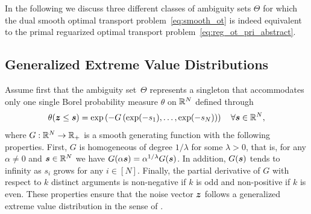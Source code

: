 \documentclass[11pt, a4paper, oneside, reqno]{article}
\begin{document}
	In the following we discuss three different classes of ambiguity sets $\Theta$ for which the dual smooth optimal transport problem~\eqref{eq:smooth_ot} is indeed equivalent to the primal reguarized optimal transport problem~\eqref{eq:reg_ot_pri_abstract}.
	
	\subsection{Generalized Extreme Value Distributions}
	\label{sec:gevm}
	Assume first that the ambiguity set~$\Theta$ represents a singleton that accommodates only one single
	Borel probability measure $\theta$ on $\mathbb{R}^N$ defined through
	\begin{equation}
	\label{eq:dist_gevd}
	\theta(\boldsymbol z \leq \boldsymbol s) = \exp \left(-G \left( \exp(-s_1),\ldots, \exp(-s_N) \right) \right)\quad \forall \boldsymbol s\in\mathbb{R}^N,
	\end{equation}
	where $G:\mathbb{R}^N \to \mathbb{R}_+$ is a smooth generating function with the following properties. First, $G$ is homogeneous of degree $1/\lambda$ for some $\lambda>0$, that is, for any $\alpha \neq 0$ and $\boldsymbol s\in \mathbb{R}^N$ we have $G(\alpha \boldsymbol s) = \alpha^{1/\lambda}G(\boldsymbol s)$. In addition, $G(\boldsymbol s)$ tends to infinity as $s_i$ grows for any $i \in [N]$. Finally, the partial derivative of $G$ with respect to $k$ distinct arguments is non-negative if $k$ is odd and non-positive if $k$ is even. These properties ensure that the noise vector $\boldsymbol z$ follows a generalized extreme value distribution in the sense of \citep[\S~4.1]{train2009discrete}. %
	
\end{document}
